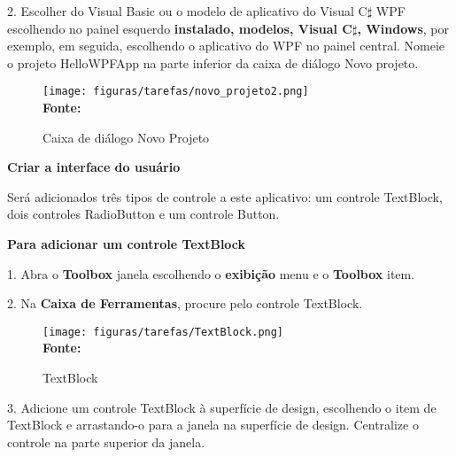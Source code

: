 2. Escolher do Visual Basic ou o modelo de aplicativo do Visual C$\sharp$ WPF escolhendo no painel esquerdo \textbf{instalado, modelos, Visual C$\sharp$, Windows}, por exemplo, em seguida, escolhendo o aplicativo do WPF no painel central. Nomeie o projeto HelloWPFApp na parte inferior da caixa de diálogo Novo projeto. 

\begin{figure}[ht!]
	\centering	
	\caption[\hspace{-0.1cm} Caixa de diálogo Novo Projeto]{Caixa de diálogo Novo Projeto}
	\vspace{-0.4cm}
	\texttt{[image: figuras/tarefas/novo\_projeto2.png]}
	\vspace{-0.2cm}
	\\\textbf{\footnotesize Fonte:~\cite {tutorial_visual:14} }
	\label{fig:novo_projeto2}
	\vspace{-0.5cm}
\end{figure}

\newpage

\textbf{Criar a interface do usuário}

Será adicionados três tipos de controle a este aplicativo: um controle TextBlock, dois controles RadioButton e um controle Button.

\textbf{Para adicionar um controle TextBlock}


1. Abra o \textbf{Toolbox} janela escolhendo o \textbf{exibição} menu e o \textbf{Toolbox} item.

2. Na \textbf{Caixa de Ferramentas}, procure pelo controle TextBlock. 

\begin{figure}[ht!]
	\centering	
	\caption[\hspace{-0.1cm} Caixa de diálogo TextBlock]{TextBlock}
	\vspace{-0.4cm}
	\texttt{[image: figuras/tarefas/TextBlock.png]}
	\vspace{-0.2cm}
	\\\textbf{\footnotesize Fonte:~\cite {tutorial_visual:14} }
	\label{fig:TextBlock}
	\vspace{-0.5cm}
\end{figure}



3. Adicione um controle TextBlock à superfície de design, escolhendo o item de TextBlock e arrastando-o para a janela na superfície de design. Centralize o controle na parte superior da janela.

